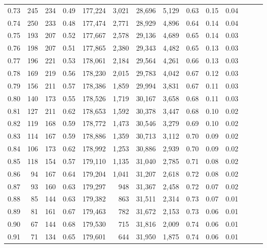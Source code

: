 \begin{tabular}{rrrrrrrrrrrrrr}
0.73 &    245 &  234 &  0.49 &  177,224 &    3,021 &  28,696 &   5,129 &  0.63 &  0.15 &      0.04 \\
0.74 &    250 &  233 &  0.48 &  177,474 &    2,771 &  28,929 &   4,896 &  0.64 &  0.14 &      0.04 \\
0.75 &    193 &  207 &  0.52 &  177,667 &    2,578 &  29,136 &   4,689 &  0.65 &  0.14 &      0.03 \\
0.76 &    198 &  207 &  0.51 &  177,865 &    2,380 &  29,343 &   4,482 &  0.65 &  0.13 &      0.03 \\
0.77 &    196 &  221 &  0.53 &  178,061 &    2,184 &  29,564 &   4,261 &  0.66 &  0.13 &      0.03 \\
0.78 &    169 &  219 &  0.56 &  178,230 &    2,015 &  29,783 &   4,042 &  0.67 &  0.12 &      0.03 \\
0.79 &    156 &  211 &  0.57 &  178,386 &    1,859 &  29,994 &   3,831 &  0.67 &  0.11 &      0.03 \\
0.80 &    140 &  173 &  0.55 &  178,526 &    1,719 &  30,167 &   3,658 &  0.68 &  0.11 &      0.03 \\
0.81 &    127 &  211 &  0.62 &  178,653 &    1,592 &  30,378 &   3,447 &  0.68 &  0.10 &      0.02 \\
0.82 &    119 &  168 &  0.59 &  178,772 &    1,473 &  30,546 &   3,279 &  0.69 &  0.10 &      0.02 \\
0.83 &    114 &  167 &  0.59 &  178,886 &    1,359 &  30,713 &   3,112 &  0.70 &  0.09 &      0.02 \\
0.84 &    106 &  173 &  0.62 &  178,992 &    1,253 &  30,886 &   2,939 &  0.70 &  0.09 &      0.02 \\
0.85 &    118 &  154 &  0.57 &  179,110 &    1,135 &  31,040 &   2,785 &  0.71 &  0.08 &      0.02 \\
0.86 &     94 &  167 &  0.64 &  179,204 &    1,041 &  31,207 &   2,618 &  0.72 &  0.08 &      0.02 \\
0.87 &     93 &  160 &  0.63 &  179,297 &      948 &  31,367 &   2,458 &  0.72 &  0.07 &      0.02 \\
0.88 &     85 &  144 &  0.63 &  179,382 &      863 &  31,511 &   2,314 &  0.73 &  0.07 &      0.01 \\
0.89 &     81 &  161 &  0.67 &  179,463 &      782 &  31,672 &   2,153 &  0.73 &  0.06 &      0.01 \\
0.90 &     67 &  144 &  0.68 &  179,530 &      715 &  31,816 &   2,009 &  0.74 &  0.06 &      0.01 \\
0.91 &     71 &  134 &  0.65 &  179,601 &      644 &  31,950 &   1,875 &  0.74 &  0.06 &      0.01 \\

\end{tabular}
